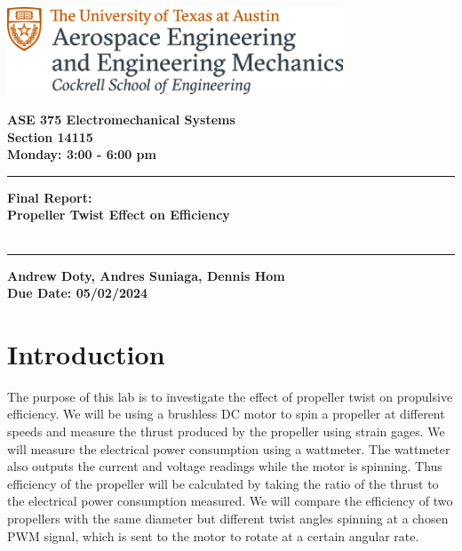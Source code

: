 \documentclass{article}
\begin{document}
\begin{titlepage}
  \centering
  \includegraphics[width=10cm]{ase-logo-formal.png}  %
  \vspace{1cm}  %
 
  \Large \textbf{ASE 375 Electromechanical Systems}\\
  \large \textbf{Section 14115}\\
  \vspace{0.5cm}
  \textbf{Monday: 3:00 - 6:00 pm}\\
 
  \vspace{1cm}
 
  \hrule
  \vspace{0.5cm}
 
  \Huge \textbf{Final Report:\\
    Propeller Twist Effect on Efficiency}\\
  \Huge \textbf{}\\
 
  \vspace{0.5cm}
  \hrule
 
  \vspace{1cm}
 
  \normalsize \textbf{Andrew Doty, Andres Suniaga, Dennis Hom}\\
  \normalsize \textbf{Due Date: 05/02/2024}
 
\end{titlepage}
\newpage

\tableofcontents
\thispagestyle{empty}
\newpage

\section{Introduction}

The purpose of this lab is to investigate the effect of propeller twist on propulsive efficiency. We will be using a brushless DC motor to spin a propeller at different speeds and measure the thrust produced by the propeller using strain gages. We will measure the electrical power consumption using a wattmeter. The wattmeter also outputs the current and voltage readings while the motor is spinning. Thus efficiency of the propeller will be calculated by taking the ratio of the thrust to the electrical power consumption measured. We will compare the efficiency of two propellers with the same diameter but different twist angles spinning at a chosen PWM signal, which is sent to the motor to rotate at a certain angular rate.
\end{document}
